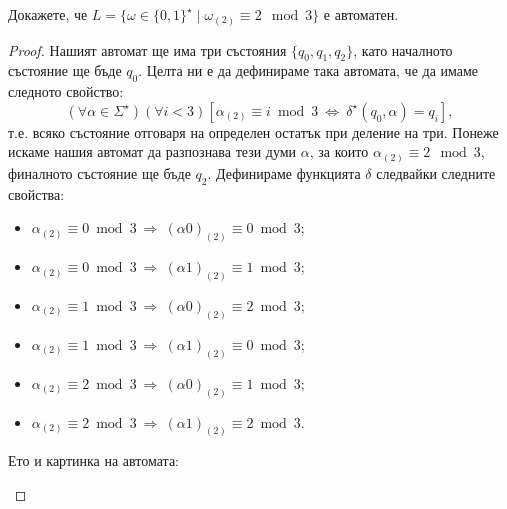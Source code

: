 \begin{problem}
  Докажете, че $L = \{\omega \in \{0,1\}^\star \mid \omega_{(2)} \equiv 2 \mod 3\}$ е автоматен.
\end{problem}
\begin{proof}
  Нашият автомат ще има три състояния $\{q_0,q_1,q_2\}$, като началното състояние ще бъде $q_0$.
  Целта ни е да дефинираме така автомата, че да имаме следното свойство:
  \[(\forall\alpha\in\Sigma^\star)(\forall i < 3)[\alpha_{(2)} \equiv i\bmod 3\ \Leftrightarrow\ \delta^\star(q_0,\alpha) = q_i],\]
  т.е. всяко състояние отговаря на определен остатък при деление на три.
  Понеже искаме нашия автомат да разпознава тези думи $\alpha$,
  за които $\alpha_{(2)} \equiv 2\mod 3$, финалното състояние ще бъде $q_2$.
  Дефинираме функцията $\delta$ следвайки следните свойства:
  \begin{itemize}
  \item
    $\alpha_{(2)} \equiv 0 \bmod 3\ \Rightarrow\ (\alpha0)_{(2)} \equiv 0 \bmod 3$;
  \item 
    $\alpha_{(2)} \equiv 0 \bmod 3\ \Rightarrow\ (\alpha1)_{(2)} \equiv 1 \bmod 3$;
  \item
    $\alpha_{(2)} \equiv 1 \bmod 3\ \Rightarrow\ (\alpha0)_{(2)} \equiv 2 \bmod 3$;
  \item 
    $\alpha_{(2)} \equiv 1 \bmod 3\ \Rightarrow\ (\alpha1)_{(2)} \equiv 0 \bmod 3$;
  \item
    $\alpha_{(2)} \equiv 2 \bmod 3\ \Rightarrow\ (\alpha0)_{(2)} \equiv 1 \bmod 3$;
  \item 
    $\alpha_{(2)} \equiv 2 \bmod 3\ \Rightarrow\ (\alpha1)_{(2)} \equiv 2 \bmod 3$.
  \end{itemize}
  Ето и картинка на автомата:
  \begin{figure}[H]
    \begin{center}
\end{center}
\end{figure}
\end{proof}
